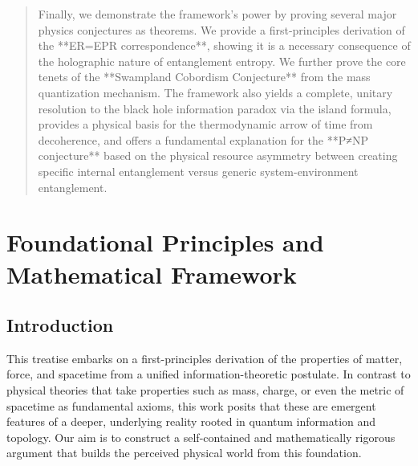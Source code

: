 \documentclass[11pt, letterpaper]{report}
\theoremstyle{plain} %
\theoremstyle{definition} %
\theoremstyle{remark} %
\begin{document}
\begin{abstract}
Finally, we demonstrate the framework's power by proving several major physics conjectures as theorems. We provide a first-principles derivation of the **ER=EPR correspondence**, showing it is a necessary consequence of the holographic nature of entanglement entropy. We further prove the core tenets of the **Swampland Cobordism Conjecture** from the mass quantization mechanism. The framework also yields a complete, unitary resolution to the black hole information paradox via the island formula, provides a physical basis for the thermodynamic arrow of time from decoherence, and offers a fundamental explanation for the **P≠NP conjecture** based on the physical resource asymmetry between creating specific internal entanglement versus generic system-environment entanglement.
\end{abstract}


\clearpage
\tableofcontents
\clearpage





\chapter{Foundational Principles and Mathematical Framework}
\label{chap:foundational_principles}

\section{Introduction}

This treatise embarks on a first-principles derivation of the properties of matter, force, and spacetime from a unified information-theoretic postulate. In contrast to physical theories that take properties such as mass, charge, or even the metric of spacetime as fundamental axioms, this work posits that these are emergent features of a deeper, underlying reality rooted in quantum information and topology. Our aim is to construct a self-contained and mathematically rigorous argument that builds the perceived physical world from this foundation.
\end{document}
